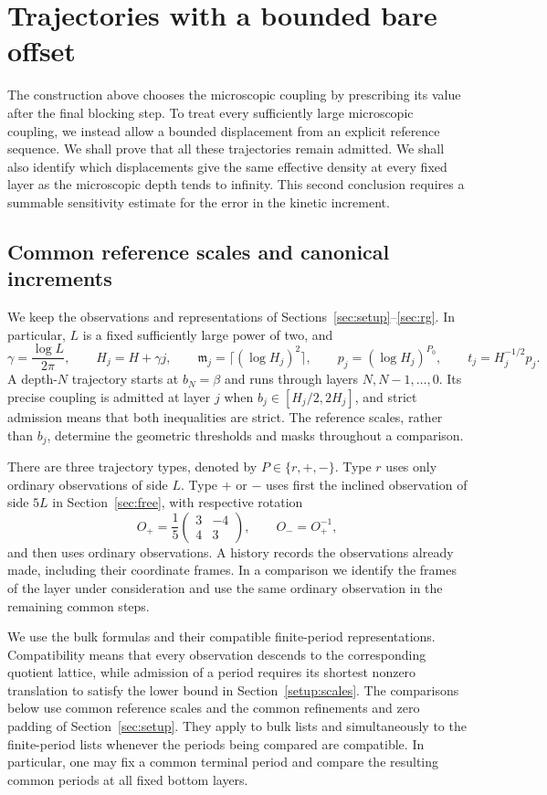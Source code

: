 \section{Trajectories with a bounded bare offset}
\label{sec:trajectories}

The construction above chooses the microscopic coupling by prescribing
its value after the final blocking step.  To treat every sufficiently
large microscopic coupling, we instead allow a bounded displacement
from an explicit reference sequence.  We shall prove that all these
trajectories remain admitted.  We shall also identify which displacements
give the same effective density at every fixed layer as the microscopic
depth tends to infinity.  This second conclusion requires a summable
sensitivity estimate for the error in the kinetic increment.

\subsection{Common reference scales and canonical increments}

We keep the observations and representations of
Sections~\ref{sec:setup}--\ref{sec:rg}.  In particular, $L$ is a fixed
sufficiently large power of two, and
\[
 \gamma=\frac{\log L}{2\pi},\qquad
 H_j=H+\gamma j,\qquad
 \mathfrak m_j=\lceil(\log H_j)^2\rceil,\qquad
 p_j=(\log H_j)^{P_0},\qquad t_j=H_j^{-1/2}p_j.
\]
A depth-$N$ trajectory starts at $b_N=\beta$ and runs through layers
$N,N-1,\ldots,0$.  Its precise coupling is admitted at layer $j$ when
$b_j\in[H_j/2,2H_j]$, and strict admission means that both inequalities
are strict.  The reference scales, rather than $b_j$, determine the
geometric thresholds and masks throughout a comparison.

There are three trajectory types, denoted by $P\in\{r,+,-\}$.
Type $r$ uses only ordinary observations of side $L$.  Type $+$ or $-$
uses first the inclined observation of side $5L$ in
Section~\ref{sec:free}, with respective rotation
\[
 O_+=\frac15\begin{pmatrix}3&-4\\4&3\end{pmatrix},
 \qquad O_-=O_+^{-1},
\]
and then uses ordinary observations.  A history records the observations
already made, including their coordinate frames.  In a comparison we
identify the frames of the layer under consideration and use the same
ordinary observation in the remaining common steps.

We use the bulk formulas and their compatible finite-period
representations.  Compatibility means that every observation descends
to the corresponding quotient lattice, while admission of a period
requires its shortest nonzero translation to satisfy the lower bound
in Section~\ref{setup:scales}.  The comparisons below use common
reference scales and the common refinements and zero padding of
Section~\ref{sec:setup}.  They apply to bulk lists and simultaneously
to the finite-period lists whenever the periods being compared are
compatible.  In particular, one may fix a common terminal period and
compare the resulting common periods at all fixed bottom layers.

